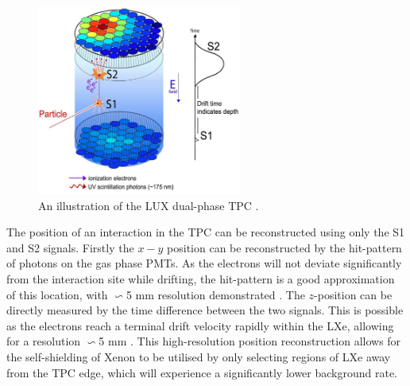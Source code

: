 \begin{figure}
    \centering
    \includegraphics[width=0.6\textwidth]{Figures/LZ/tpc_theory.png}
    \caption{An illustration of the LUX dual-phase TPC \cite{lux_ref}.}
    \label{fig:TPC_theory}
\end{figure}

\par
The position of an interaction in the TPC can be reconstructed using only the S1 and S2 signals.
Firstly the $x-y$ position can be reconstructed by the hit-pattern of photons on the gas phase PMTs. 
As the electrons will not deviate significantly from the interaction site while drifting, the hit-pattern is a good approximation of this location, with $\backsim$5 mm resolution demonstrated \cite{lux_position_reconstruction_ref}.
The $z$-position can be directly measured by the time difference between the two signals.
This is possible as the electrons reach a terminal drift velocity rapidly within the LXe, allowing for a resolution $\backsim$5 mm \cite{LZ_TechnicalDesignReview_ref}.
This high-resolution position reconstruction allows for the self-shielding of Xenon to be utilised by only selecting regions of LXe away from the TPC edge, which will experience a significantly lower background rate.

